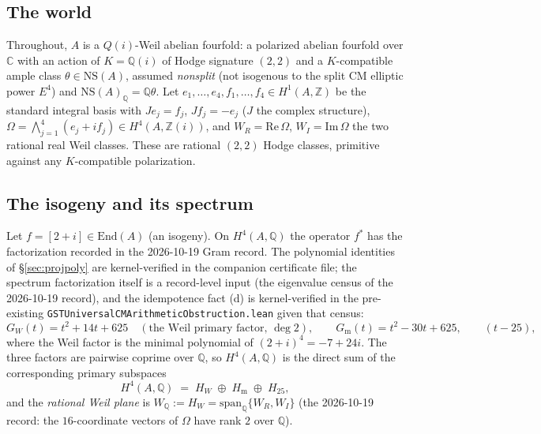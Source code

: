 \documentclass[11pt]{article}
\begin{document}
\subsection{The world}
Throughout, $A$ is a $Q(i)$-Weil abelian fourfold: a polarized abelian fourfold over $\mathbb{C}$ with an action of
$K=\mathbb{Q}(i)$ of Hodge signature $(2,2)$ and a $K$-compatible ample class $\theta\in\mathrm{NS}(A)$, assumed
\emph{nonsplit} (not isogenous to the split CM elliptic power $E^4$) and $\mathrm{NS}(A)_{\mathbb{Q}}=\mathbb{Q}\theta$.
Let $e_1,\dots,e_4,f_1,\dots,f_4\in H^1(A,\mathbb{Z})$ be the standard integral basis with $J e_j=f_j$, $J f_j=-e_j$
($J$ the complex structure), $\Omega=\bigwedge_{j=1}^4(e_j+if_j)\in H^4(A,\mathbb{Z}(i))$, and
$W_R=\mathrm{Re}\,\Omega$, $W_I=\mathrm{Im}\,\Omega$ the two rational real Weil classes. These are rational
$(2,2)$ Hodge classes, primitive against any $K$-compatible polarization.

\subsection{The isogeny and its spectrum}
Let $f=[2+i]\in\mathrm{End}(A)$ (an isogeny). On $H^4(A,\mathbb{Q})$ the operator $f^*$ has the factorization
recorded in the 2026-10-19 Gram record. The polynomial identities of \S\ref{sec:projpoly} are
kernel-verified in the companion certificate file; the spectrum factorization itself is a record-level input
(the eigenvalue census of the 2026-10-19 record), and the idempotence fact (d) is kernel-verified in the
pre-existing \texttt{GSTUniversalCMArithmeticObstruction.lean} given that census:
\[
G_W(t)=t^2+14t+625 \quad(\text{the Weil primary factor, }\deg 2),\qquad
G_{\mathrm{m}}(t)=t^2-30t+625,\qquad (t-25),
\]
where the Weil factor is the minimal polynomial of $(2+i)^4=-7+24i$. The three factors are pairwise coprime over
$\mathbb{Q}$, so $H^4(A,\mathbb{Q})$ is the direct sum of the corresponding primary subspaces
\[
H^4(A,\mathbb{Q}) \;=\; H_W \;\oplus\; H_{\mathrm{m}} \;\oplus\; H_{25},
\]
and the \emph{rational Weil plane} is $W_{\mathbb{Q}}:=H_W=\mathrm{span}_{\mathbb{Q}}\{W_R,W_I\}$ (the 2026-10-19
record: the $16$-coordinate vectors of $\Omega$ have rank $2$ over $\mathbb{Q}$).
\end{document}
